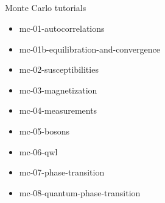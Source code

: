 \subsection*{\redm\whiteb\greenm}
\begin{frame}[t,fragile]{Monte Carlo tutorials}
  \begin{itemize}
  \item mc-01-autocorrelations
  \item mc-01b-equilibration-and-convergence
  \item mc-02-susceptibilities
  \item mc-03-magnetization
  \item mc-04-measurements
  \item mc-05-bosons
  \item mc-06-qwl
  \item mc-07-phase-transition
  \item mc-08-quantum-phase-transition
  \end{itemize}
\end{frame}


